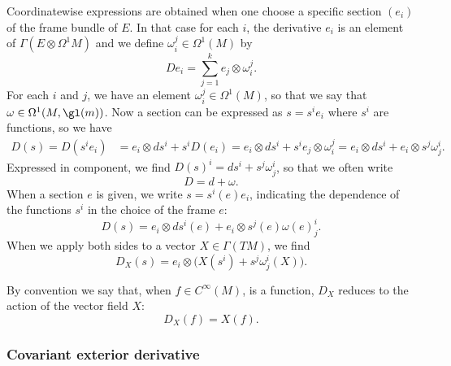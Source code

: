 Coordinatewise expressions are obtained when one choose a specific section $(e_i)$ of the frame bundle of $E$. In that case for each $i$, the derivative $e_i$ is an element of $\Gamma(E\otimes\Omega^1M)$ and we define $\omega_i^j\in\Omega^1(M)$ by
\begin{equation}
De_i=\sum_{j=1}^ke_j\otimes \omega_i^j.
\end{equation}
For each $i$ and $j$, we have an element $\omega_i^j\in\Omega^1(M)$, so that we say that $\omega\in\Omega^1(M,\gl(m))$. Now a section can be expressed as $s=s^ie_i$ where $s^i$ are functions, so we have
\begin{align}
  D(s)=D(s^ie_i)	&=e_i\otimes ds^i+s^iD(e_i)=e_i\otimes ds^i+s^ie_j\otimes \omega_i^j=e_i\otimes ds^i+e_i\otimes s^j\omega_j^i.
\end{align}
Expressed in component, we find $D(s)^i=ds^i+s^j\omega_j^i$, so that we often write
\begin{equation}
D=d+\omega.
\end{equation}
When a section $e$ is given, we write $s=s^i(e)e_i$, indicating the dependence of the functions $s^i$ in the choice of the frame $e$:
\[
  D(s)=e_i\otimes ds^i(e)+e_i\otimes s^j(e)\omega(e)_j^i.
\]
When we apply both sides to a vector $X\in\Gamma(TM)$, we find
\begin{equation}
D_X(s)=e_i\otimes\Big( X(s^i)+s^j\omega^i_j(X) \Big).
\end{equation}

By convention we say that, when $f\in C^{\infty}(M)$, is a function, $D_X$ reduces to the action of the vector field $X$:
\begin{equation}
  D_X(f)=X(f).
\end{equation}


\subsubsection{Covariant exterior derivative}

